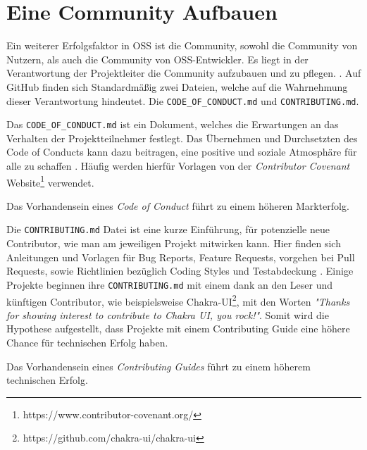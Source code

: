 \section{Eine Community Aufbauen} \label{ssec:Eine Community Aufbauen}




Ein weiterer Erfolgsfaktor in OSS ist die Community, sowohl die Community von Nutzern, als auch die
Community von OSS-Entwickler. Es liegt in der Verantwortung der Projektleiter die Community aufzubauen
und zu pflegen. \cite{bangerthWhatMakesComputational2013,GitHubBuildingWelcomingCommunities2022}.
Auf GitHub finden sich Standardmäßig zwei Dateien, welche auf die Wahrnehmung dieser Verantwortung
hindeutet. Die \texttt{CODE\_OF\_CONDUCT.md} und \texttt{CONTRIBUTING.md}.

\bigskip

Das \texttt{CODE\_OF\_CONDUCT.md} ist ein Dokument, welches die Erwartungen an das Verhalten der
Projektteilnehmer festlegt.
Das Übernehmen und Durchsetzten des Code of Conducts kann dazu beitragen, eine positive und soziale
Atmosphäre für alle zu schaffen \cite{GitHubYourCodeOfConduct2022}. %
Häufig werden hierfür Vorlagen von der \textit{Contributor Covenant} 
Website\footnote{https://www.contributor-covenant.org/} verwendet.

\begin{hypothesis}
    Das Vorhandensein eines \textit{Code of Conduct} führt zu einem höheren Markterfolg.
    \label{H:4}
\end{hypothesis}

Die \texttt{CONTRIBUTING.md} Datei ist eine kurze Einführung, für potenzielle neue Contributor,
wie man am jeweiligen Projekt mitwirken kann. Hier finden sich Anleitungen und Vorlagen für 
Bug Reports, Feature Requests, vorgehen bei Pull Requests, sowie Richtlinien bezüglich 
Coding Styles und Testabdeckung \cite{GitHubStartingAProject2022}. %
Einige Projekte beginnen ihre \texttt{CONTRIBUTING.md} mit einem dank an den Leser und künftigen
Contributor, wie beispielsweise Chakra-UI\footnote{https://github.com/chakra-ui/chakra-ui},
mit den Worten 
\textit{"Thanks for showing interest to contribute to Chakra UI, you rock!"}.
Somit wird die Hypothese aufgestellt, dass Projekte mit einem Contributing Guide eine höhere
Chance für technischen Erfolg haben.

\begin{hypothesis}
    Das Vorhandensein eines \textit{Contributing Guides} führt zu einem höherem technischen Erfolg.
    \label{H:5}
\end{hypothesis}